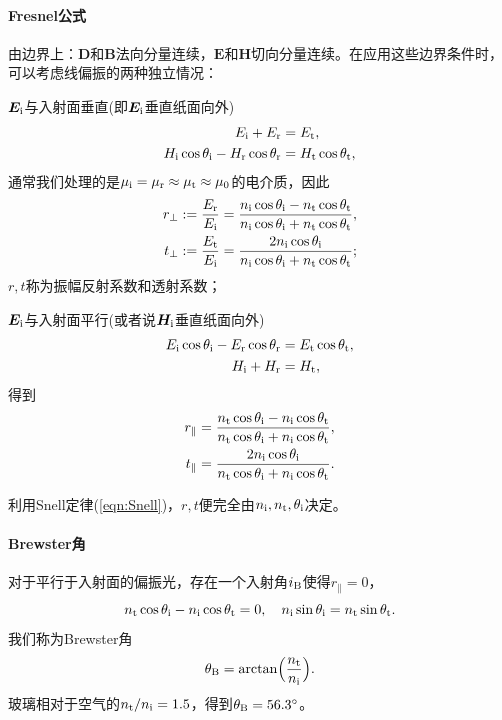 \paragraph{Fresnel公式}
由边界上：$\bm D$和$\bm B$法向分量连续，$\bm E$和$\bm H$切向分量连续。在应用这些边界条件时，可以考虑线偏振的两种独立情况：
\begin{compactenum}
	\item $\bm E_{\mathrm{i}}$与入射面垂直(即$\bm E_{\mathrm{i}}$垂直纸面向外)%
	\begin{align*}
        E_{\mathrm{i}}+E_\text r&=E_\text t,\\
        H_{\mathrm{i}}\cos\theta_{\mathrm{i}}-H_\text r\cos\theta_\text r&=H_\text t\cos\theta_\text t,
    \end{align*}
    通常我们处理的是$\mu_{\mathrm{i}}=\mu_\text r\approx\mu_\text t\approx\mu_0$的电介质，因此
    \begin{align}
        \label{eqn:Fresnel rperp}
        r_\perp:=\frac{E_\text r}{E_{\mathrm{i}}}=\frac{n_{\mathrm{i}}\cos\theta_{\mathrm{i}}-n_\text t\cos\theta_\text t}{n_{\mathrm{i}}\cos\theta_{\mathrm{i}}+n_\text t\cos\theta_\text t},\\
        \label{eqn:Fresnel tperp}
        t_\perp:=\frac{E_\text t}{E_{\mathrm{i}}}=\frac{2n_{\mathrm{i}}\cos\theta_{\mathrm{i}}}{n_{\mathrm{i}}\cos\theta_{\mathrm{i}}+n_\text t\cos\theta_\text t};
    \end{align}
    $r,t$称为振幅反射系数和透射系数；
	\item $\bm E_{\mathrm{i}}$与入射面平行(或者说$\bm H_{\mathrm{i}}$垂直纸面向外)
	\begin{align*}
        E_{\mathrm{i}}\cos\theta_{\mathrm{i}}-E_\text r\cos\theta_\text r&=E_\text t\cos\theta_\text t,\\
        H_{\mathrm{i}}+H_\text r&=H_\text t,
    \end{align*}
    得到 
    \begin{align}
        \label{eqn:Fresnel rpara}
        r_\parallel&=\frac{n_\text t\cos\theta_{\mathrm{i}}-n_{\mathrm{i}}\cos\theta_\text t}{n_\text t\cos\theta_{\mathrm{i}}+n_{\mathrm{i}}\cos\theta_\text t},\\
        \label{eqn:Fresnel tpara}
        t_\parallel&=\frac{2n_{\mathrm{i}}\cos\theta_{\mathrm{i}}}{n_\text t\cos\theta_{\mathrm{i}}+n_{\mathrm{i}}\cos\theta_\text t}.
    \end{align}
\end{compactenum}
利用Snell定律(\ref{eqn:Snell})，$r,t$便完全由$n_{\mathrm{i}},n_\text t,\theta_{\mathrm{i}}$决定。
\paragraph{Brewster角}
对于平行于入射面的偏振光，存在一个入射角$i_\text B$使得$r_\parallel=0$，%
\[
    n_\text t\cos\theta_{\mathrm{i}}-n_{\mathrm{i}}\cos\theta_\text t=0,\quad n_{\mathrm{i}}\sin\theta_{\mathrm{i}}=n_\text t\sin\theta_\text t.
\]
我们称为Brewster角
\begin{equation}
    \label{eqn:Brewster}
    \theta_\text B=\arctan\Bigl(\frac{n_\text t}{n_{\mathrm{i}}}\Bigr).
\end{equation}
玻璃相对于空气的$n_\text t/n_{\mathrm{i}}=1.5$，得到$\theta_\text B=56.3^\circ$。
